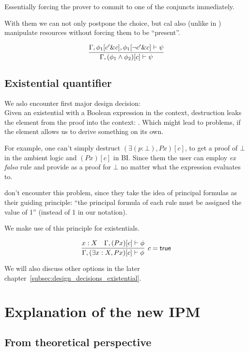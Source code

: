 {Essentially forcing the prover to commit to one of the conjuncts immediately.

With them we can not only postpone the choice, but cal also (unlike in \cite{harlandResourceDistributionBooleanConstraints2003}) manipulate resources without forcing them to be ``present''.

\[
\infer{\Gamma, (\phi_1 \wedge \phi_2)[c] \vdash \psi}
      {\Gamma, \phi_1[c' \& c], \phi_1[\neg c' \& c] \vdash \psi}
\]

\subsection{Existential quantifier}
\label{subsec:exist-quant}

We aslo encounter first major design decision:\\
Given an existential with a Boolean expression in the context, destruction leaks the element from the proof into the context: .
Which might lead to problems, if the element allows us to derive something on its own.

For example, one can't simply destruct \((\exists (p : \bot), P x)[c]\), to get a proof of \(\bot\) in the ambient logic and \((P x)[c]\) in BI\@.
Since them the user can employ \emph{ex falso} rule and provide  as a proof for \(\bot\) no matter what the expression evaluates to.

\citet[page 5]{harlandResourceDistributionBooleanConstraints2003} don't encounter this problem, since they take the idea of principal formulas as their guiding principle: ``the principal formula of each rule must be assigned the value of 1'' (\true instead of 1 in our notation).

We make use of this principle for existentials.

\[
\infer[c = \true]
      {\Gamma, (\exists x : X, P x)[c] \vdash \phi}
      {x : X &
       \Gamma, (P x)[c] \vdash \phi}
\]

We will also discuss other options in the later chapter~\ref{subsec:design_decisions_existential}.


\section{Explanation of the new IPM}

\subsection{From theoretical perspective}

}
